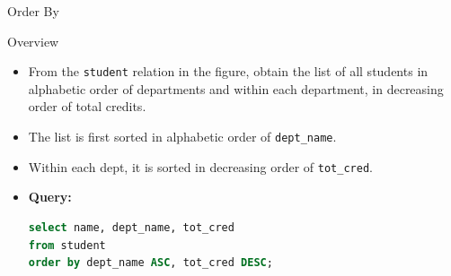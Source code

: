 \documentclass[aspectratio=169, xcolor=dvipsnames]{beamer}
\begin{document}
\begin{frame}[fragile]{Order By}
    \begin{block}{Overview}
        \begin{itemize}[<+->]
            \item From the \texttt{student} relation in the figure, obtain the list of all students in alphabetic order of departments and within each department, in decreasing order of total credits.
            \item The list is first sorted in alphabetic order of \texttt{dept\_name}.
            \item Within each dept, it is sorted in decreasing order of \texttt{tot\_cred}.
            \item \textbf{Query:}
            \begin{lstlisting}[language=SQL]
select name, dept_name, tot_cred 
from student 
order by dept_name ASC, tot_cred DESC;
            \end{lstlisting}
        \end{itemize}
    \end{block}
\end{frame}
\end{document}
